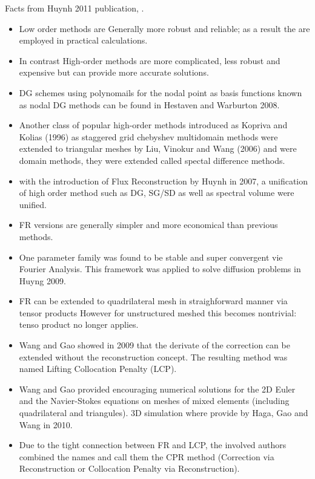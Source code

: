 \begin{frame}[allowframebreaks]
 Facts from Huynh 2011 publication, \cite{Huynh2011}.
 \begin{itemize}
  \item Low order methods are Generally more robust and reliable; as a result the are employed in practical calculations.
  \item In contrast High-order methods are more complicated, less robust and expensive but can provide more accurate solutions.
  \item DG schemes using polynomails for the nodal point as basis functions known as nodal DG methods can be found in Hestaven and Warburton 2008.
  \item Another class of popular high-order methods introduced as Kopriva and Kolias (1996) as staggered grid chebyshev multidomain methods were extended to triangular meshes by Liu, Vinokur and Wang (2006) and were domain methods, they were extended called spectal difference methods. 
  \item with the introduction of Flux Reconstruction by Huynh in 2007, a unification of high order method such as DG, SG/SD as well as spectral volume were unified.
  \item FR versions are generally simpler and more economical than previous methods.
  \item One parameter family was found to be stable and super convergent vie Fourier Analysis. This framework was applied to solve diffusion problems in Huyng 2009.
  \item FR can be extended to quadrilateral mesh in straighforward manner via tensor products However for unstructured meshed this becomes nontrivial: tenso product no longer applies.
  \item Wang and Gao showed in 2009 that the derivate of the correction can be extended without the reconstruction concept. The resulting method was named Lifting Collocation Penalty (LCP).
  \item Wang and Gao provided encouraging numerical solutions for the 2D Euler and the Navier-Stokes equations on meshes of mixed elements (including quadrilateral and triangules). 3D simulation where provide by Haga, Gao and Wang in 2010.
  \item Due to the tight connection between FR and LCP, the involved authors combined the names and call them the CPR method (Correction via Reconstruction or Collocation Penalty via Reconstruction). 
 \end{itemize}  
\end{frame}


